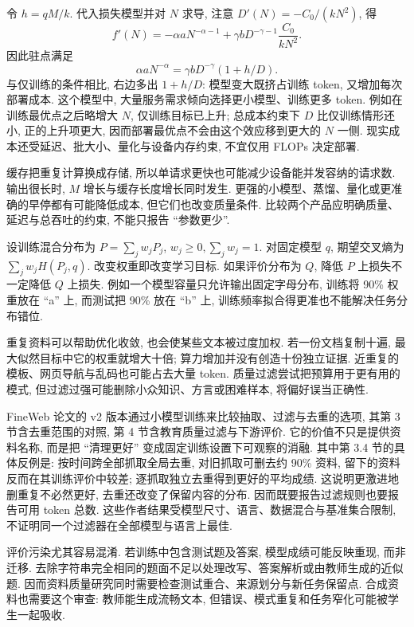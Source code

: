 令 $h=qM/k$. 代入损失模型并对 $N$ 求导, 注意 $D'(N)=-C_0/(kN^2)$, 得
\[
f'(N)=-\alpha aN^{-\alpha-1}
+\gamma bD^{-\gamma-1}\frac{C_0}{kN^2}.
\]
因此驻点满足
\[
\alpha aN^{-\alpha}=\gamma bD^{-\gamma}(1+h/D).
\]
与仅训练的条件相比, 右边多出 $1+h/D$: 模型变大既挤占训练 token, 又增加每次部署成本. 这个模型中, 大量服务需求倾向选择更小模型、训练更多 token. 例如在训练最优点之后略增大 $N$, 仅训练目标已上升; 总成本约束下 $D$ 比仅训练情形还小, 正的上升项更大, 因而部署最优点不会由这个效应移到更大的 $N$ 一侧. 现实成本还受延迟、批大小、量化与设备内存约束, 不宜仅用 FLOPs 决定部署.

缓存把重复计算换成存储, 所以单请求更快也可能减少设备能并发容纳的请求数. 输出很长时, $M$ 增长与缓存长度增长同时发生. 更强的小模型、蒸馏、量化或更准确的早停都有可能降低成本, 但它们也改变质量条件. 比较两个产品应明确质量、延迟与总吞吐的约束, 不能只报告 ``参数更少''.

\label{sec:progress-data}
设训练混合分布为 $P=\sum_jw_jP_j$, $w_j\ge0,\sum_jw_j=1$. 对固定模型 $q$, 期望交叉熵为 $\sum_jw_jH(P_j,q)$. 改变权重即改变学习目标. 如果评价分布为 $Q$, 降低 $P$ 上损失不一定降低 $Q$ 上损失. 例如一个模型容量只允许输出固定字母分布, 训练将 90\% 权重放在 ``a'' 上, 而测试把 90\% 放在 ``b'' 上, 训练频率拟合得更准也不能解决任务分布错位.

重复资料可以帮助优化收敛, 也会使某些文本被过度加权. 若一份文档复制十遍, 最大似然目标中它的权重就增大十倍; 算力增加并没有创造十份独立证据. 近重复的模板、网页导航与乱码也可能占去大量 token. 质量过滤尝试把预算用于更有用的模式, 但过滤过强可能删除小众知识、方言或困难样本, 将偏好误当正确性.

FineWeb 论文的 v2 版本通过小模型训练来比较抽取、过滤与去重的选项, 其第 3 节含去重范围的对照, 第 4 节含教育质量过滤与下游评价\cite{fineweb}. 它的价值不只是提供资料名称, 而是把 ``清理更好'' 变成固定训练设置下可观察的消融. 其中第 3.4 节的具体反例是: 按时间跨全部抓取全局去重, 对旧抓取可删去约 90\% 资料, 留下的资料反而在其训练评价中较差; 逐抓取独立去重得到更好的平均成绩. 这说明更激进地删重复不必然更好, 去重还改变了保留内容的分布. 因而既要报告过滤规则也要报告可用 token 总数. 这些作者结果受模型尺寸、语言、数据混合与基准集合限制, 不证明同一个过滤器在全部模型与语言上最佳.

评价污染尤其容易混淆. 若训练中包含测试题及答案, 模型成绩可能反映重现, 而非迁移. 去除字符串完全相同的题面不足以处理改写、答案解析或由教师生成的近似题. 因而资料质量研究同时需要检查测试重合、来源划分与新任务保留点. 合成资料也需要这个审查: 教师能生成流畅文本, 但错误、模式重复和任务窄化可能被学生一起吸收.


